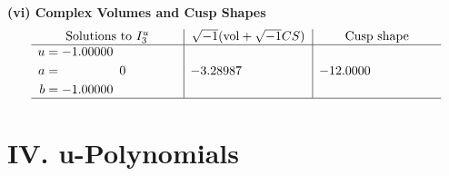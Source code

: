 \documentclass[1p]{elsarticle_modified}
\theoremstyle{definition}
\newcommand{\I}{\sqrt{-1}}
\begin{document}
\newpage\flushleft \textbf{(vi) Complex Volumes and Cusp Shapes}
$$\begin{array}{c|c|c}  
\text{Solutions to }I^u_{3}& \I (\text{vol} + \sqrt{-1}CS) & \text{Cusp shape}\\
 \hline 
\begin{aligned}
u &= -1.00000\phantom{ +0.000000I} \\
a &= \phantom{-0.000000 } 0 \\
b &= -1.00000\phantom{ +0.000000I}\end{aligned}
 & -3.28987\phantom{ +0.000000I} & -12.0000\phantom{ +0.000000I}\\
 \hline 
 \end{array}$$\newpage
\newpage\renewcommand{\arraystretch}{1}
\centering \section*{ IV. u-Polynomials}
\end{document}
